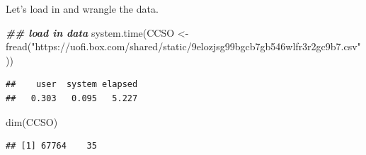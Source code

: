 \documentclass[
  ignorenonframetext,
]{beamer}
\newenvironment{Shaded}{\begin{snugshade}}{\end{snugshade}}
\newcommand{\DocumentationTok}[1]{\textcolor[rgb]{0.56,0.35,0.01}{\textbf{\textit{#1}}}}
\newcommand{\FunctionTok}[1]{\textcolor[rgb]{0.00,0.00,0.00}{#1}}
\newcommand{\NormalTok}[1]{#1}
\newcommand{\OtherTok}[1]{\textcolor[rgb]{0.56,0.35,0.01}{#1}}
\newcommand{\StringTok}[1]{\textcolor[rgb]{0.31,0.60,0.02}{#1}}
\begin{document}
\begin{frame}[fragile]{}
\protect\hypertarget{section-3}{}
Let's load in and wrangle the data.

\tiny

\begin{Shaded}
\begin{Highlighting}[]
\DocumentationTok{\#\# load in data}
\FunctionTok{system.time}\NormalTok{(CCSO }\OtherTok{\textless{}{-}} \FunctionTok{fread}\NormalTok{(}\StringTok{"https://uofi.box.com/shared/static/9elozjsg99bgcb7gb546wlfr3r2gc9b7.csv"}\NormalTok{))}
\end{Highlighting}
\end{Shaded}

\begin{verbatim}
##    user  system elapsed 
##   0.303   0.095   5.227
\end{verbatim}

\begin{Shaded}
\begin{Highlighting}[]
\FunctionTok{dim}\NormalTok{(CCSO)}
\end{Highlighting}
\end{Shaded}

\begin{verbatim}
## [1] 67764    35
\end{verbatim}


\end{frame}
\end{document}
